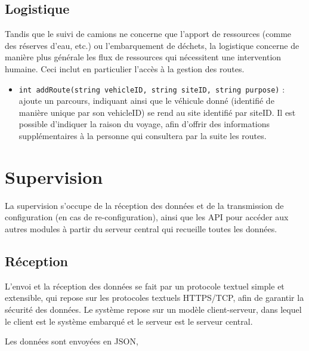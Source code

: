 \subsection{Logistique}

Tandis que le suivi de camions ne concerne que l'apport de ressources (comme des réserves d'eau, etc.) ou l'embarquement de déchets, la logistique concerne de manière plus générale les flux de ressources qui nécessitent une intervention humaine. Ceci inclut en particulier l'accès à la gestion des routes.

\begin{itemize}
\item \texttt{int addRoute(string vehicleID, string siteID, string purpose)} : ajoute un parcours, indiquant ainsi que le véhicule donné (identifié de manière unique par son vehicleID) se rend au site identifié par siteID. Il est possible d'indiquer la raison du voyage, afin d'offrir des informations supplémentaires à la personne qui consultera par la suite les routes.
\end{itemize}


\section{Supervision}

La supervision s'occupe de la réception des données et de la transmission de configuration (en cas de re-configuration), ainsi que les API pour accéder aux autres modules à partir du serveur central qui recueille toutes les données.

\subsection{Réception}

L'envoi et la réception des données se fait par un protocole textuel simple et extensible, qui repose sur les protocoles textuels HTTPS/TCP, afin de garantir la sécurité des données. Le système repose sur un modèle client-serveur, dans lequel le client est le système embarqué et le serveur est le serveur central.

Les données sont envoyées en JSON\footnotemark, 


